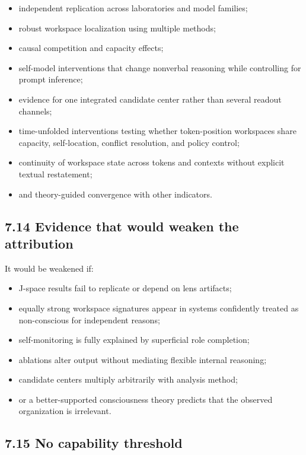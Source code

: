 \documentclass[
  11pt,
]{article}
\providecommand{\tightlist}{%
  \setlength{\itemsep}{0pt}\setlength{\parskip}{0pt}}
\begin{document}
\begin{itemize}
\tightlist
\item
  independent replication across laboratories and model families;
\item
  robust workspace localization using multiple methods;
\item
  causal competition and capacity effects;
\item
  self-model interventions that change nonverbal reasoning while
  controlling for prompt inference;
\item
  evidence for one integrated candidate center rather than several
  readout channels;
\item
  time-unfolded interventions testing whether token-position workspaces
  share capacity, self-location, conflict resolution, and policy
  control;
\item
  continuity of workspace state across tokens and contexts without
  explicit textual restatement;
\item
  and theory-guided convergence with other indicators.
\end{itemize}

\subsection{7.14 Evidence that would weaken the
attribution}\label{evidence-that-would-weaken-the-attribution}

It would be weakened if:

\begin{itemize}
\tightlist
\item
  J-space results fail to replicate or depend on lens artifacts;
\item
  equally strong workspace signatures appear in systems confidently
  treated as non-conscious for independent reasons;
\item
  self-monitoring is fully explained by superficial role completion;
\item
  ablations alter output without mediating flexible internal reasoning;
\item
  candidate centers multiply arbitrarily with analysis method;
\item
  or a better-supported consciousness theory predicts that the observed
  organization is irrelevant.
\end{itemize}

\subsection{7.15 No capability threshold}\label{no-capability-threshold}
\end{document}
